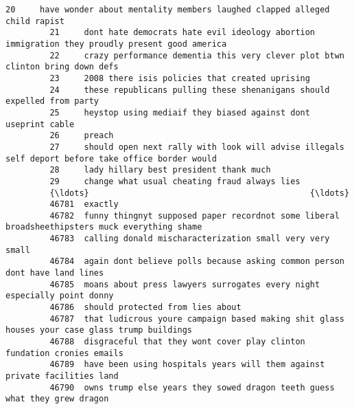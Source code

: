 \documentclass[11pt]{article}
\begin{document}
\begin{Verbatim}[commandchars=\\\{\}]
         20     have wonder about mentality members laughed clapped alleged child rapist                                    
         21     dont hate democrats hate evil ideology abortion immigration they proudly present good america               
         22     crazy performance dementia this very clever plot btwn clinton bring down defs                               
         23     2008 there isis policies that created uprising                                                              
         24     these republicans pulling these shenanigans should expelled from party                                      
         25     heystop using mediaif they biased against dont useprint cable                                               
         26     preach                                                                                                      
         27     should open next rally with look will advise illegals self deport before take office border would           
         28     lady hillary best president thank much                                                                      
         29     change what usual cheating fraud always lies                                                                
         {\ldots}                                             {\ldots}                                                                
         46781  exactly                                                                                                     
         46782  funny thingnyt supposed paper recordnot some liberal broadsheethipsters muck everything shame               
         46783  calling donald mischaracterization small very very small                                                    
         46784  again dont believe polls because asking common person dont have land lines                                  
         46785  moans about press lawyers surrogates every night especially point donny                                     
         46786  should protected from lies about                                                                            
         46787  that ludicrous youre campaign based making shit glass houses your case glass trump buildings                
         46788  disgraceful that they wont cover play clinton fundation cronies emails                                      
         46789  have been using hospitals years will them against private facilities land                                   
         46790  owns trump else years they sowed dragon teeth guess what they grew dragon                                   

\end{Verbatim}
\end{document}
